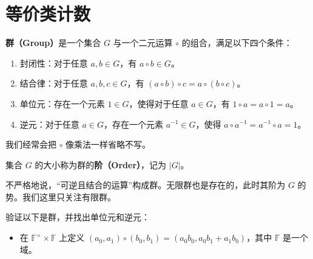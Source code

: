 \chapter{等价类计数}


\begin{definition}[群]
    \textbf{群（Group）}是一个集合 $G$ 与一个二元运算 $\circ$ 的组合，满足以下四个条件：
    \begin{enumerate}
        \item 封闭性：对于任意 $a, b \in G$，有 $a \circ b \in G$。
        \item 结合律：对于任意 $a, b, c \in G$，有 $(a \circ b) \circ c = a \circ (b \circ c)$。
        \item 单位元：存在一个元素 $1 \in G$，使得对于任意 $a \in G$，有 $1 \circ a = a \circ 1 = a$。
        \item 逆元：对于任意 $a \in G$，存在一个元素 $a^{-1} \in G$，使得 $a \circ a^{-1} = a^{-1} \circ a = 1$。
    \end{enumerate}
    我们经常会把 $\circ$ 像乘法一样省略不写。

    集合 $G$ 的大小称为群的\textbf{阶（Order）}，记为 $|G|$。
\end{definition}
\begin{remark}
    不严格地说，“可逆且结合的运算”构成群。无限群也是存在的，此时其阶为 $G$ 的势。我们这里只关注有限群。
\end{remark}

\begin{example}
    验证以下是群，并找出单位元和逆元：
    \begin{itemize}
        \item 在 $\mathbb F^{\times}\times \mathbb F$ 上定义 $(a_0,a_1)\circ (b_0,b_1)=(a_0b_0,a_0b_1+a_1b_0)$，其中 $\mathbb F$ 是一个域。
    \end{itemize}
\end{example}

\begin{definition}[子群]
    
\end{definition}


